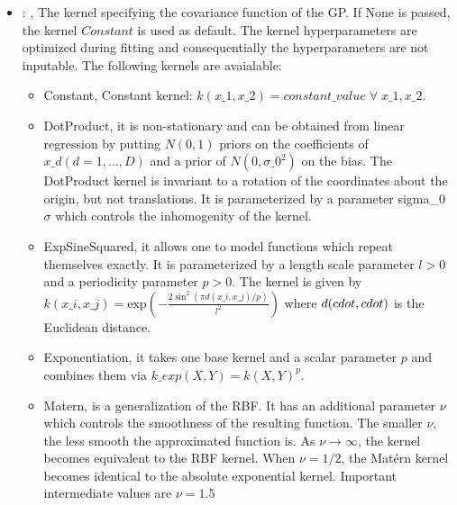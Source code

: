 \begin{itemize}
    \item {}: , 
      The kernel specifying the covariance function of the GP. If None is passed,
      the kernel $Constant$ is used as default. The kernel hyperparameters are optimized during
      fitting and consequentially the hyperparameters are
      not inputable. The following kernels are avaialable:
      \begin{itemize}                                                    \item Constant, Constant
      kernel: $k(x\_1, x\_2) = constant\_value \;\forall\; x\_1, x\_2$.
      \item DotProduct, it is non-stationary and can be obtained from linear regression by putting
      $N(0, 1)$ priors on the coefficients of $x\_d (d = 1, . . . , D)$
      and a prior of $N(0, \sigma\_0^2)$ on the bias. The DotProduct kernel is invariant to a
      rotation of the coordinates about the origin, but not translations.
      It is parameterized by a parameter sigma\_0 $\sigma$ which controls the inhomogenity of the
      kernel.                                                    \item ExpSineSquared, it allows one
      to model functions which repeat themselves exactly. It is parameterized by a length scale
      parameter $l>0$ and a periodicity parameter $p>0$.
      The kernel is given by $k(x\_i, x\_j) = \text{exp}\left(-\frac{ 2\sin^2(\pi d(x\_i, x\_j)/p) }{ l^
      2} \right)$ where $d(\\cdot,\\cdot)$ is the Euclidean distance.
      \item Exponentiation, it takes one base kernel and a scalar parameter $p$ and combines them
      via $k\_{exp}(X, Y) = k(X, Y) ^p$.                                                    \item
      Matern, is a generalization of the RBF. It has an additional parameter $\nu$ which controls
      the smoothness of the resulting function. The smaller $\nu$,
      the less smooth the approximated function is. As $\nu\rightarrow\infty$, the kernel becomes
      equivalent to the RBF kernel. When $\nu = 1/2$, the Matérn kernel becomes
      identical to the absolute exponential kernel. Important intermediate values are $\nu = 1.5$

\end{itemize}
\end{itemize}
